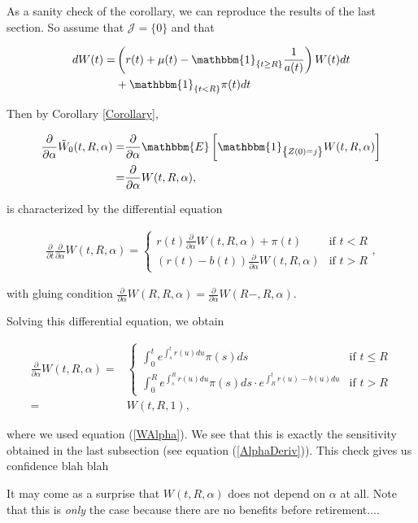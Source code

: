\documentclass{article}
\newcommand{\1}[1]{\mathbbm{1}_{\left\lbrace #1 \right\rbrace}}
\newcommand{\expec}[1][def]{\mathbbm{E} \left[ #1 \right]}
\theoremstyle{break}
\theoremstyle{remark}
\numberwithin{equation}{section}
\begin{document}
\begin{example}
	As a sanity check of the corollary, we can reproduce the results of the last section. So assume that $\mathcal{J} = \{ 0 \}$ and that
	
	\begin{align*}
		dW(t) =& \left( r(t) + \mu(t) - \1{t \geq R} \frac{1}{a(t)}\right) W(t)dt \\
		&+ \1{t<R} \pi(t)dt
	\end{align*}

	Then by Corollary \ref{Corollary},
	
	\begin{align*}
		\frac{\partial}{\partial \alpha} \tilde{W}_0(t,R,\alpha) =&  \frac{\partial}{\partial \alpha} \expec[\1{Z(0)=j} W(t,R,\alpha)] \\
		=&\frac{\partial}{\partial \alpha} W(t,R,\alpha),
	\end{align*}

	is characterized by the differential equation
	
	\begin{align*}
		\frac{\partial}{\partial t} \frac{\partial}{\partial \alpha} W(t,R,\alpha) = \left\{
		\begin{array}{ll}
			r(t) \frac{\partial}{\partial \alpha} W(t,R,\alpha) + \pi(t) & \mbox{if } t < R \\
			\left( r(t) - b(t) \right) \frac{\partial}{\partial \alpha} W(t,R,\alpha) & \mbox{if } t > R
		\end{array}
		\right.,
	\end{align*}

	with gluing condition $\frac{\partial}{\partial \alpha} W(R,R,\alpha) = \frac{\partial}{\partial \alpha} W(R-,R,\alpha)$.
	
	Solving this differential equation, we obtain
	
	\begin{align*}
	\frac{\partial}{\partial \alpha} W(t,R,\alpha) =& \left\{
		\begin{array}{ll}
			\int_0^t e^{\int_s^t r(u) du} \pi(s) ds & \mbox{if } t \leq R \\
			\int_0^R e^{\int_s^R r(u) du} \pi(s) ds \cdot e^{\int_R^t r(u) - b(u) du} & \mbox{if } t > R
		\end{array}
		\right. \\
		=& W(t,R,1),
	\end{align*}

	where we used equation (\ref{WAlpha}). We see that this is exactly the sensitivity obtained in the last subsection (see equation (\ref{AlphaDeriv})). This check gives us confidence blah blah
	
	It may come as a surprise that $W(t,R,\alpha)$ does not depend on $\alpha$ at all. Note that this is \textit{only} the case because there are no benefits before retirement....
\end{example}
\end{document}
